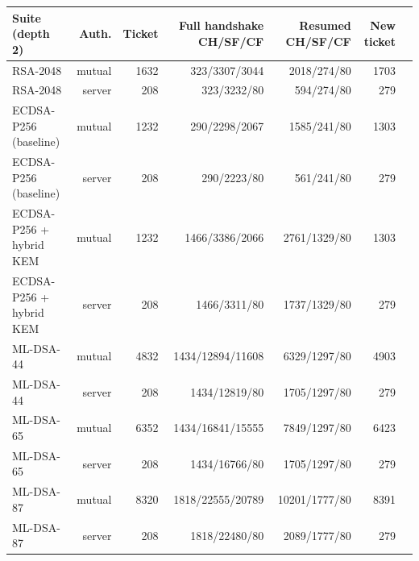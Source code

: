 \begin{tabular}{@{}lrrrrrr@{}}
\toprule
Suite (depth 2) & Auth. & Ticket & Full handshake CH/SF/CF & Resumed CH/SF/CF & New ticket \\
\midrule
RSA-2048 & mutual & 1632 & 323/3307/3044 & 2018/274/80 & 1703 \\
RSA-2048 & server & 208 & 323/3232/80 & 594/274/80 & 279 \\
ECDSA-P256 (baseline) & mutual & 1232 & 290/2298/2067 & 1585/241/80 & 1303 \\
ECDSA-P256 (baseline) & server & 208 & 290/2223/80 & 561/241/80 & 279 \\
ECDSA-P256 + hybrid KEM & mutual & 1232 & 1466/3386/2066 & 2761/1329/80 & 1303 \\
ECDSA-P256 + hybrid KEM & server & 208 & 1466/3311/80 & 1737/1329/80 & 279 \\
ML-DSA-44 & mutual & 4832 & 1434/12894/11608 & 6329/1297/80 & 4903 \\
ML-DSA-44 & server & 208 & 1434/12819/80 & 1705/1297/80 & 279 \\
ML-DSA-65 & mutual & 6352 & 1434/16841/15555 & 7849/1297/80 & 6423 \\
ML-DSA-65 & server & 208 & 1434/16766/80 & 1705/1297/80 & 279 \\
ML-DSA-87 & mutual & 8320 & 1818/22555/20789 & 10201/1777/80 & 8391 \\
ML-DSA-87 & server & 208 & 1818/22480/80 & 2089/1777/80 & 279 \\
\bottomrule
\end{tabular}

